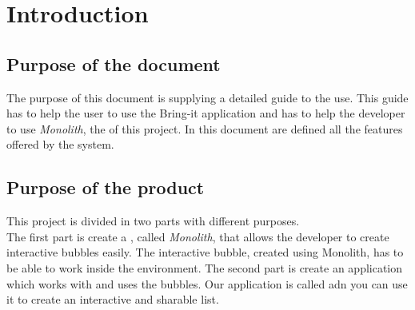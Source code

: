 \section{Introduction}

\subsection{Purpose of the document}
The purpose of this document is supplying a detailed guide to the use. This guide has to help the user to use the Bring-it application and has to help the developer to use \textit{Monolith}, the  of this project. In this document are defined all the features offered by the system.

\subsection{Purpose of the product}
This project is divided in two parts with different purposes. \\
The first part is create a , called \textit{Monolith}, that allows the developer to create interactive bubbles easily. The interactive bubble, created using Monolith, has to be able to
work inside the  environment.
The second part is create an application which works with  and uses the bubbles. Our application is called  adn you can use it to create an interactive and sharable list.

